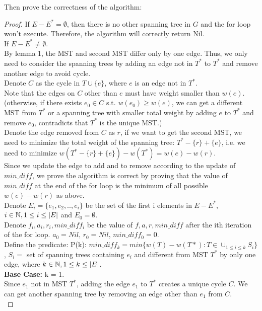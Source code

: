 \documentclass[11pt]{article}
\begin{document}
\begin{enumerate}
Then prove the correctness of the algorithm: 
\begin{proof}
    If $E - E^* = \emptyset$, then there is no other spanning tree in $G$ and the for loop won't execute. Therefore, the algorithm will correctly return Nil.\\[2ex]
    If $E- E^* \neq \emptyset$.\\
    By lemma 1, the MST and second MST differ only by one edge. Thus, we only need to consider the spanning trees by adding an edge not in $T^*$ to $T^*$ and remove another edge to avoid cycle.\\
    Denote $C$ as the cycle in $T\cup\{e\}$, where $e$ is an edge not in $T^*$.\\
    Note that the edges on $C$ other than $e$ must have weight smaller than $w(e)$. (otherwise, if there exists $e_0 \in C$ s.t. $w(e_0) \geq w(e)$, we can get a different MST from $T^*$ or a spanning tree with smaller total weight by adding $e$ to $T^*$ and remove $e_0$, contradicts that $T^*$ is the unique MST.)\\
    Denote the edge removed from $C$ as $r$, if we want to get the second MST, we need to minimize the total weight of the spanning tree: $T^* - \{r\} + \{e\}$, i.e. we need to minimize $w(T^* - \{r\} + \{e\}) - w(T^*) =  w(e) - w(r)$.\\[2ex]
    Since we update the edge to add and to remove according to the update of $min\_diff$,  we prove the algorithm is correct by proving that the value of $min\_diff$ at the end of the for loop is the minimum of all possible $w(e) - w(r)$ as above. \\[2ex] 
    Denote $E_i = \{e_1, e_2, .., e_i\}$ be the set of the first i elements in $E - E^*$, $i\in \mathbb N, 1\leq i \leq |E|$ and $E_0 = \emptyset$.\\
    Denote $f_i, a_i, r_i, min\_diff_{i}$ be the value of $f, a, r, min\_diff$ after the ith iteration of the for loop. $a_0 = Nil$, $r_0 = Nil$, $min\_diff_{0} = 0$.\\[2ex]
    Define the predicate: P(k): $min\_diff_{k} = min\{w(T) - w(T*): T \in \cup_{1\leq i \leq k} S_i\}$, $S_i =$ set of spanning trees containing $e_i$ and different from MST $T^*$ by only one edge, where $k\in \mathbb N, 1\leq k \leq |E|$.\\[2ex]
\textbf{Base Case: } k = 1. \\
    Since $e_1$ not in MST $T^*$, adding the edge $e_1$ to $T^*$ creates a unique cycle $C$. We can get another spanning tree by removing an edge other than $e_1$ from $C$.\\

\end{proof}
\end{enumerate}
\end{document}
